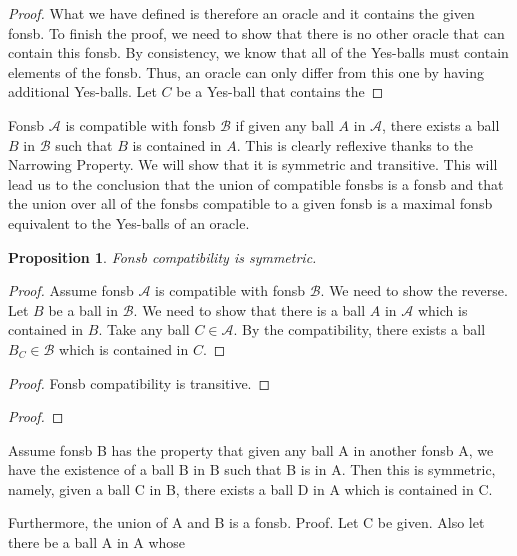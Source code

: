 \documentclass[12pt]{article}
\newtheorem{proposition}{Proposition}[section]
\begin{document}
\begin{proof}
    What we have defined is therefore an oracle and it contains the given fonsb. To finish the proof, we need to show that there is no other oracle that can contain this fonsb. By consistency, we know that all of the Yes-balls must contain elements of the fonsb. Thus, an oracle can only differ from this one by having additional Yes-balls. Let $C$ be a Yes-ball that contains the 
    
\end{proof}




Fonsb $\mathcal{A}$ is compatible with fonsb $\mathcal{B}$ if given any ball $A$ in $\mathcal{A}$, there exists a ball $B$ in $\mathcal{B}$ such that $B$ is contained in $A$. This is clearly reflexive thanks to the Narrowing Property. We will show that it is symmetric and transitive. This will lead us to the conclusion that the union of compatible fonsbs is a fonsb and that the union over all of the fonsbs compatible to a given fonsb is a maximal fonsb equivalent to the Yes-balls of an oracle.  

\begin{proposition}
 Fonsb compatibility is symmetric.
\end{proposition}

\begin{proof}
    Assume fonsb $\mathcal{A}$ is compatible with fonsb $\mathcal{B}$. We need to show the reverse. Let $B$ be a ball in $\mathcal{B}$. We need to show that there is a ball $A$ in $\mathcal{A}$ which is contained in $B$. Take any ball $C \in \mathcal{A}$. By the compatibility, there exists a ball $B_C \in \mathcal{B}$ which is contained in $C$. 
\end{proof}

\begin{proof}
    Fonsb compatibility is transitive.
\end{proof}

\begin{proof}
    
\end{proof}

 Assume fonsb B has the property that given any ball A in another
fonsb A, we have the existence of a ball B in B such that B is in A. Then this is
symmetric, namely, given a ball C in B, there exists a ball D in A which is contained
in C. 


Furthermore, the union of A and B is a fonsb.
Proof. Let C be given. Also let there be a ball A in A whose
\end{document}
